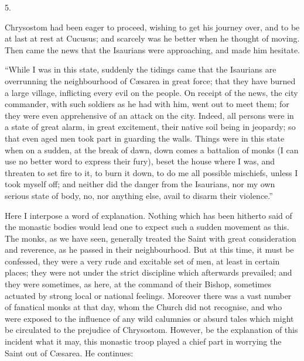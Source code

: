 5.

Chrysostom had been eager to proceed, wishing to get his journey
over, and to be at last at rest at Cucusus; and scarcely was he better
when he thought of moving. Then came the news that the Isaurians were
approaching, and made him hesitate.

``While I was in this state, suddenly the tidings came that the
Isaurians are overrunning the neighbourhood of Cæsarea in great
force; that they have burned a large village, inflicting every evil on
the people. On receipt of the news, the city commander, with such
soldiers as he had with him, went out to meet them; for they were even
apprehensive of an attack on the city. Indeed, all persons were in a
state of great alarm, in great excitement, their native soil being in
jeopardy; so that even aged men took part in guarding the walls.
Things were in this state when on a sudden, at the break of dawn, down
comes a battalion of monks (I can use no
better word to express their fury), beset the house where I was, and
threaten to set fire to it, to burn it down, to do me all possible
mischiefs, unless I took myself off; and neither did the danger from
the Isaurians, nor my own serious state of body, no, nor anything
else, avail to disarm their violence.''

Here I interpose a word of explanation. Nothing which has been
hitherto said of the monastic bodies would lead one to expect such a
sudden movement as this. The monks, as we have seen, generally treated
the Saint with great consideration and reverence, as he passed in
their neighbourhood. But at this time, it must be confessed, they were
a very rude and excitable set of men, at least in certain places; they
were not under the strict discipline which afterwards prevailed; and
they were sometimes, as here, at the command of their Bishop,
sometimes actuated by strong local or national feelings. Moreover
there was a vast number of fanatical monks at that day, whom the
Church did not recognise, and who were exposed to the influence of any
wild calumnies or absurd tales which might be circulated to the
prejudice of Chrysostom. However, be the explanation of this incident
what it may, this monastic troop played a chief part in worrying the
Saint out of Cæsarea. He continues:

